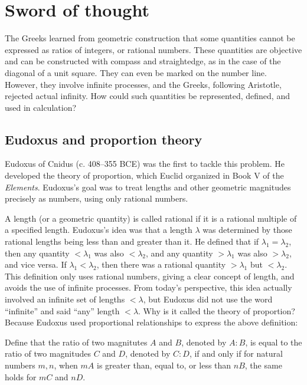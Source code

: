 \documentclass[b5paper]{article}
\begin{document}
\section{Sword of thought}

The Greeks learned from geometric construction that some quantities cannot be expressed as ratios of integers, or rational numbers. These quantities are objective and can be constructed with compass and straightedge, as in the case of the diagonal of a unit square. They can even be marked on the number line. However, they involve infinite processes, and the Greeks, following Aristotle, rejected actual infinity. How could such quantities be represented, defined, and used in calculation?

\subsection{Eudoxus and proportion theory}

Eudoxus of Cnidus (c. 408--355 BCE) was the first to tackle this problem. He developed the theory of proportion, which Euclid organized in Book V of the \emph{Elements}. Eudoxus's goal was to treat lengths and other geometric magnitudes precisely as numbers, using only rational numbers.

A length (or a geometric quantity) is called rational if it is a rational multiple of a specified length. Eudoxus's idea was that a length $\lambda$ was determined by those rational lengths being less than and greater than it. He defined that if $\lambda_1 = \lambda_2$, then any quantity $< \lambda_1$ was also $< \lambda_2$, and any quantity $> \lambda_1$ was also $> \lambda_2$, and vice versa. If $\lambda_1 < \lambda_2$, then there was a rational quantity $> \lambda_1$ but $< \lambda_2$. This definition only uses rational numbers, giving a clear concept of length, and avoids the use of infinite processes. From today's perspective, this idea actually involved an infinite set of lengths $< \lambda$, but Eudoxus did not use the word \enquote{infinite} and said \enquote{any} length $< \lambda$. Why is it called the theory of proportion? Because Eudoxus used proportional relationships to express the above definition:

\begin{definition}[Eudoxus]
Define that the ratio of two magnitutes $A$ and $B$, denoted by $A:B$, is equal to the ratio of two magnitudes $C$ and $D$, denoted by $C:D$, if and only if for  natural numbers $m, n$, when $mA$ is greater than, equal to, or less than $nB$, the same holds for $mC$ and $nD$.
\end{definition}
\end{document}
